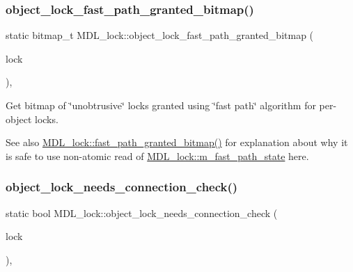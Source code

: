 \subsubsection{\texorpdfstring{object\+\_\+lock\+\_\+fast\+\_\+path\+\_\+granted\+\_\+bitmap()}{object\_lock\_fast\_path\_granted\_bitmap()}}
{\footnotesize\ttfamily static bitmap\+\_\+t M\+D\+L\+\_\+lock\+::object\+\_\+lock\+\_\+fast\+\_\+path\+\_\+granted\+\_\+bitmap (\begin{DoxyParamCaption}\item[{const \mbox{\hyperlink{classMDL__lock}{M\+D\+L\+\_\+lock}} \&}]{lock }\end{DoxyParamCaption})\hspace{0.3cm}{\ttfamily [inline]}, {\ttfamily [static]}}

Get bitmap of \char`\"{}unobtrusive\char`\"{} locks granted using \char`\"{}fast path\char`\"{} algorithm for per-\/object locks.

\begin{DoxySeeAlso}{See also}
\mbox{\hyperlink{classMDL__lock_a44d77e8b91c3f09ac46adb6dccf7a460}{M\+D\+L\+\_\+lock\+::fast\+\_\+path\+\_\+granted\+\_\+bitmap()}} for explanation about why it is safe to use non-\/atomic read of \mbox{\hyperlink{classMDL__lock_ae680877b7079a862d294ccbefed6372c}{M\+D\+L\+\_\+lock\+::m\+\_\+fast\+\_\+path\+\_\+state}} here. 
\end{DoxySeeAlso}
\mbox{\label{classMDL__lock_a1ab1e1914e48faa93ba2e862cddfc274}} 
\subsubsection{\texorpdfstring{object\+\_\+lock\+\_\+needs\+\_\+connection\+\_\+check()}{object\_lock\_needs\_connection\_check()}}
{\footnotesize\ttfamily static bool M\+D\+L\+\_\+lock\+::object\+\_\+lock\+\_\+needs\+\_\+connection\+\_\+check (\begin{DoxyParamCaption}\item[{const \mbox{\hyperlink{classMDL__lock}{M\+D\+L\+\_\+lock}} $\ast$}]{lock }\end{DoxyParamCaption})\hspace{0.3cm}{\ttfamily [inline]}, {\ttfamily [static]}}

